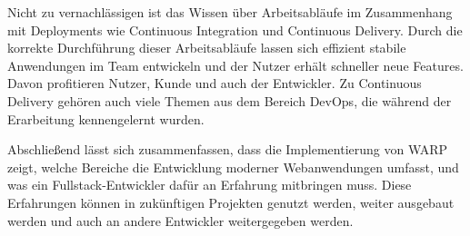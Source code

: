 Nicht zu vernachlässigen ist das Wissen über Arbeitsabläufe im Zusammenhang mit Deployments wie Continuous Integration und Continuous Delivery. Durch die korrekte Durchführung dieser Arbeitsabläufe lassen sich effizient stabile Anwendungen im Team entwickeln und der Nutzer erhält schneller neue Features. Davon profitieren Nutzer, Kunde und auch der Entwickler. Zu Continuous Delivery gehören auch viele Themen aus dem Bereich DevOps, die während der Erarbeitung kennengelernt wurden.

Abschließend lässt sich zusammenfassen, dass die Implementierung von WARP zeigt, welche Bereiche die Entwicklung moderner Webanwendungen umfasst, und was ein Fullstack-Entwickler dafür an Erfahrung mitbringen muss. Diese Erfahrungen können in zukünftigen Projekten genutzt werden, weiter ausgebaut werden und auch an andere Entwickler weitergegeben werden.
